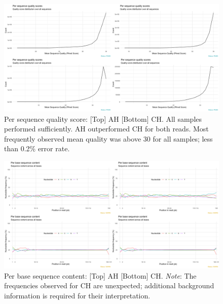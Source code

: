 \documentclass{article}
\begin{document}
\begin{figure}[h] \hspace*{0cm} 
\begin{center}
    \includegraphics[scale=0.25]{fastqcr/p2}
	\caption{Per sequence quality score: [Top] AH [Bottom] CH. All samples performed sufficiently.  AH outperformed CH for both reads.
	Most frequently observed mean quality was above 30 for all samples; less than 0.2\% error rate.
	}
	\label{fig:p2}
\end{center}
\end{figure}

\begin{figure}[h] \hspace*{0cm} 
\begin{center}
    \includegraphics[scale=0.25]{fastqcr/p3}
	\caption{Per base sequence content: [Top] AH [Bottom] CH. \textit{Note}: The frequencies observed for CH are unexpected; additional background information is required for their interpretation.}
	\label{fig:p3}
\end{center}
\end{figure}
\end{document}

